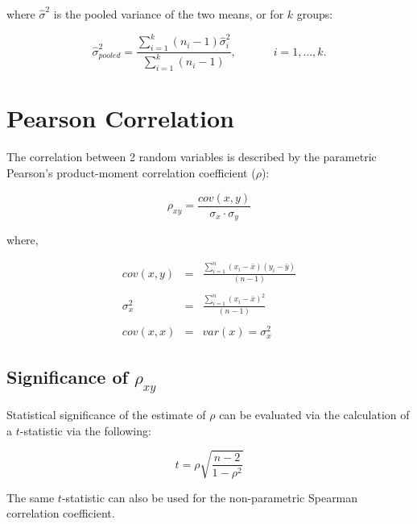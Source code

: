 \documentclass[12pt]{article}
\def \mysigma{\hat{\sigma}^2}
\begin{document}
where $\mysigma$ is the pooled variance of the two means, or for $k$ groups:

\begin{equation}
  \mysigma_{pooled} = \frac{\sum_{i=1}^k(n_i - 1)\mysigma_i}{\sum_{i=1}^k(n_i-1)}, \quad\quad\quad\; i=1,\dots,k.
\end{equation}




\section{Pearson Correlation}

The correlation between 2 random variables is described by the
parametric Pearson's product-moment correlation coefficient ($\rho$):

\begin{equation}
  \rho_{xy} = \frac{cov(x,y)}{\sigma_x \cdot \sigma_y}
\end{equation}

where,

\begin{eqnarray}
  cov(x,y) &=& \frac{ \sum_{i=1}^n(x_i - \bar{x})(y_i - \bar{y}) }{ (n - 1) } \\
  && \nonumber \\
  \sigma_x^2 &=& \frac{ \sum_{i=1}^n(x_i - \bar{x})^2}{ (n - 1) } \\
  && \nonumber \\
  cov(x,x) &=& var(x) = \sigma_x^2
\end{eqnarray}


\subsection{Significance of $\rho_{xy}$}

Statistical significance of the estimate of $\rho$ can be evaluated via
the calculation of a $t$-statistic via the following:

\begin{equation}
  t = \rho \sqrt{\frac{n - 2}{1 - \rho^2}}
\end{equation}

The same $t$-statistic can also be used for the non-parametric
Spearman correlation coefficient.
\end{document}
